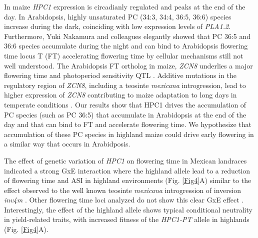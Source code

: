 \documentclass[9pt,twocolumn,twoside,lineno]{BioRxiv}
\begin{document}
In maize \textit{HPC1} expression is circadianly regulated\cite{Khan2010-iv} and peaks at the end of the day. 
In Arabidopsis, highly unsaturated PC (34:3, 34:4, 36:5, 36:6) species increase during the dark\cite{Maatta2012-ip}, coinciding with low expression levels of \textit{PLA1.2}\cite{Khan2010-iv}.
Furthermore, Yuki Nakamura and colleagues elegantly showed that PC 36:5 and 36:6 species accumulate during the night and can bind to Arabidopsis flowering time locus T (FT) accelerating flowering time \cite{Nakamura2014-qf} by cellular mechanisms still not well understood. 
The Arabidopsis FT ortholog in maize, \textit{ZCN8} \cite{Lazakis2011-nq} underlies a major flowering time and photoperiod sensitivity QTL \cite{Hung2012-ms}.
Additive mutations in the regulatory region of \textit{ZCN8}, including a teosinte \textit{mexicana} introgression, lead to higher expression of \textit{ZCN8} contributing to maize adaptation to long days in temperate conditions \cite{Guo2019-pn}.
Our results show that HPC1 drives the accumulation of PC species (such as PC 36:5) that accumulate in Arabidopsis at the end of the day and that can bind to FT and accelerate flowering time. 
We hypothesize that accumulation of these PC species in highland maize could drive early flowering in a similar way that occurs in Arabidposis. 

The effect of genetic variation of \textit{HPC1} on flowering time in Mexican landraces indicated a strong GxE interaction where the highland allele lead to a reduction of flowering time and ASI in highland environments (Fig. \ref{Fig4}A) similar to the effect observed to the well known teosinte \textit{mexicana} introgression of inversion \textit{inv4m} \cite{Crow2020-gene}.
Other flowering time loci analyzed do not show this clear GxE effect \cite{Gates2019-xu}.
Interestingly, the effect of the highland allele shows typical conditional neutrality in yield-related traits, with increased fitness of the \textit{HPC1-PT} allele in highlands (Fig. \ref{Fig4}A).
\end{document}
